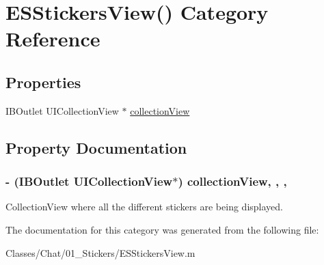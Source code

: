 \hypertarget{category_e_s_stickers_view_07_08}{}\section{E\+S\+Stickers\+View() Category Reference}
\label{category_e_s_stickers_view_07_08}
\subsection*{Properties}
\begin{DoxyCompactItemize}
\item 
I\+B\+Outlet U\+I\+Collection\+View $\ast$ \hyperlink{category_e_s_stickers_view_07_08_ac681f8ef62f1899501b2ced8c1f25e6c}{collection\+View}
\end{DoxyCompactItemize}


\subsection{Property Documentation}
\hypertarget{category_e_s_stickers_view_07_08_ac681f8ef62f1899501b2ced8c1f25e6c}{}
\subsubsection[{collection\+View}]{\setlength{\rightskip}{0pt plus 5cm}-\/ (I\+B\+Outlet U\+I\+Collection\+View$\ast$) collection\+View\hspace{0.3cm}{\ttfamily [read]}, {\ttfamily [write]}, {\ttfamily [nonatomic]}, {\ttfamily [strong]}}\label{category_e_s_stickers_view_07_08_ac681f8ef62f1899501b2ced8c1f25e6c}
Collection\+View where all the different stickers are being displayed. 

The documentation for this category was generated from the following file\+:\begin{DoxyCompactItemize}
\item 
Classes/\+Chat/01\+\_\+\+Stickers/E\+S\+Stickers\+View.\+m\end{DoxyCompactItemize}
